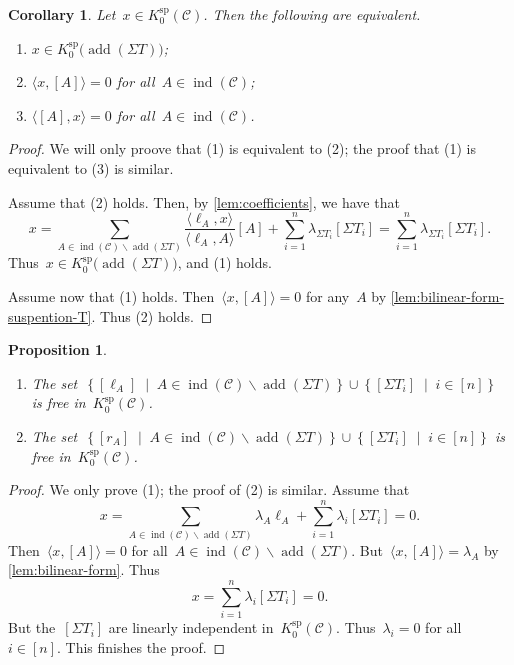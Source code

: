 \documentclass{amsart}
\newtheorem{corollary}[theorem]{Corollary}
\newtheorem{proposition}[theorem]{Proposition}
\theoremstyle{definition}
\newcommand{\set}[2]{\left\{ #1 \;\middle|\; #2 \right\}} %
\newcommand{\ssm}{\smallsetminus} %
\newcommand{\cat}{\mathcal{C}}
\newcommand{\susp}{\Sigma}
\newcommand{\add}{\operatorname{add}}
\newcommand{\spl}{\operatorname{sp}}
\newcommand{\Ksp}{K_0^{\spl}}
\newcommand{\ind}{\operatorname{ind}}
\begin{document}
\begin{corollary}
\label{lem:test-susp-T}
Let~$x \in \Ksp(\cat)$. Then the following are equivalent.
\begin{enumerate}
\item $x \in \Ksp \big( \add(\susp T) \big)$;
\item $\langle x, [A]\rangle = 0$ for all~$A \in \ind(\cat)$;
\item $\langle [A], x \rangle = 0$ for all~$A \in \ind(\cat)$.
\end{enumerate}
\end{corollary}

\begin{proof}
We will only proove that (1) is equivalent to (2); the proof that (1) is equivalent to (3) is similar. 
 
Assume that (2) holds. Then, by \cref{lem:coefficients}, we have that
\[
x = \sum_{A \in \ind(\cat) \ssm \add(\susp T)} \frac{\langle \ell_A, x \rangle}{\langle \ell_A, A \rangle}[A] + \sum_{i=1}^n \lambda_{\susp T_i} [\susp T_i] = \sum_{i=1}^n \lambda_{\susp T_i} [\susp T_i].
\]
Thus~$x \in \Ksp \big( \add(\susp T) \big)$, and (1) holds.
 
Assume now that (1) holds. Then~$\langle x, [A]\rangle = 0$ for any~$A$ by \cref{lem:bilinear-form-suspention-T}. Thus (2) holds.
\end{proof}

\begin{proposition}
\label{prop:free-set}
\begin{enumerate}
\item The set~$\set{[\ell_A]}{A \in \ind(\cat) \ssm \add(\susp T)} \cup \set{[\susp T_i]}{i \in [n]}$ is free in~$\Ksp(\cat)$.
\item The set~$\set{[r_A]}{A \in \ind(\cat) \ssm \add(\susp T)} \cup \set{[\susp T_i]}{i \in [n]}$ is free in~$\Ksp(\cat)$.
\end{enumerate}
\end{proposition}

\begin{proof}
We only prove (1); the proof of (2) is similar. Assume that~
\[
x= \sum_{A \in \ind(\cat) \ssm \add(\susp T)} \lambda_A \ell_A + \sum_{i=1}^n \lambda_i [\susp T_i] = 0.
\]
Then~$\langle x, [A] \rangle = 0$ for all~$A\in\ind(\cat) \ssm \add(\susp T)$. But~$\langle x, [A] \rangle = \lambda_A$ by \cref{lem:bilinear-form}. Thus~
\[
x = \sum_{i=1}^n \lambda_i [\susp T_i] = 0.
\]
But the~$[\susp T_i]$ are linearly independent in~$\Ksp(\cat)$. Thus~$\lambda_i = 0$ for all~$i \in [n]$. This finishes the proof.
\end{proof}
\end{document}
